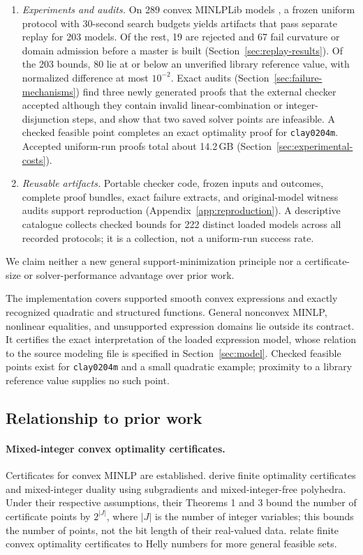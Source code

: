 \begin{enumerate}
\item \emph{Experiments and audits.} On 289 convex MINLPLib models \citep{minlplib}, a frozen uniform protocol with 30-second search budgets yields artifacts that pass separate replay for 203 models. Of the rest, 19 are rejected and 67 fail curvature or domain admission before a master is built (Section~\ref{sec:replay-results}). Of the 203 bounds, 80 lie at or below an unverified library reference value, with normalized difference at most $10^{-2}$. Exact audits (Section~\ref{sec:failure-mechanisms}) find three newly generated proofs that the external checker accepted although they contain invalid linear-combination or integer-disjunction steps, and show that two saved solver points are infeasible. A checked feasible point completes an exact optimality proof for \texttt{clay0204m}. Accepted uniform-run proofs total about 14.2\,GB (Section~\ref{sec:experimental-costs}).
\item \emph{Reusable artifacts.} Portable checker code, frozen inputs and outcomes, complete proof bundles, exact failure extracts, and original-model witness audits support reproduction (Appendix~\ref{app:reproduction}). A descriptive catalogue collects checked bounds for 222 distinct loaded models across all recorded protocols; it is a collection, not a uniform-run success rate.
\end{enumerate}
We claim neither a new general support-minimization principle nor a certificate-size or solver-performance advantage over prior work.

The implementation covers supported smooth convex expressions and exactly recognized quadratic and structured functions. General nonconvex MINLP, nonlinear equalities, and unsupported expression domains lie outside its contract. It certifies the exact interpretation of the loaded expression model, whose relation to the source modeling file is specified in Section~\ref{sec:model}. Checked feasible points exist for \texttt{clay0204m} and a small quadratic example; proximity to a library reference value supplies no such point.

\subsection{Relationship to prior work}
\label{sec:prior-work}
\paragraph{Mixed-integer convex optimality certificates.}
Certificates for convex MINLP are established. \citet{baes2016-duality-for-mixed-integer-convex} derive finite optimality certificates and mixed-integer duality using subgradients and mixed-integer-free polyhedra. Under their respective assumptions, their Theorems 1 and 3 bound the number of certificate points by $2^{|J|}$, where $|J|$ is the number of integer variables; this bounds the number of points, not the bit length of their real-valued data. \citet{basu2017-optimality-certificates-for-convex-minimization} relate finite convex optimality certificates to Helly numbers for more general feasible sets.

